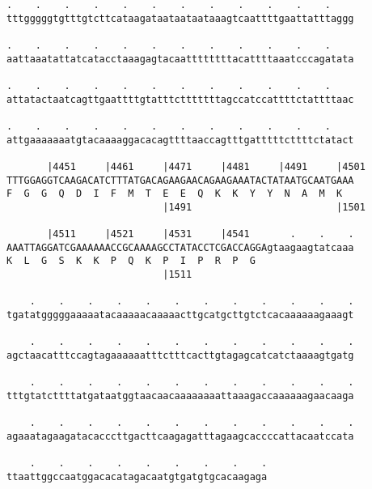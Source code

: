 \documentclass{article}
\begin{document}
\begin{Verbatim}
.    .    .    .    .    .    .    .    .    .    .    .    
tttgggggtgtttgtcttcataagataataataataaagtcaattttgaattatttaggg
                                                            
.    .    .    .    .    .    .    .    .    .    .    .    
aattaaatattatcatacctaaagagtacaattttttttacattttaaatcccagatata
                                                            
.    .    .    .    .    .    .    .    .    .    .    .    
attatactaatcagttgaattttgtatttctttttttagccatccattttctattttaac
                                                            
.    .    .    .    .    .    .    .    .    .    .    .    
attgaaaaaaatgtacaaaaggacacagttttaaccagtttgatttttcttttctatact
                                                            
       |4451     |4461     |4471     |4481     |4491     |4501
TTTGGAGGTCAAGACATCTTTATGACAGAAGAACAGAAGAAATACTATAATGCAATGAAA
F  G  G  Q  D  I  F  M  T  E  E  Q  K  K  Y  Y  N  A  M  K  
                           |1491                         |1501
  
       |4511     |4521     |4531     |4541       .    .    .
AAATTAGGATCGAAAAAACCGCAAAAGCCTATACCTCGACCAGGAgtaagaagtatcaaa
K  L  G  S  K  K  P  Q  K  P  I  P  R  P  G                 
                           |1511                            
  
    .    .    .    .    .    .    .    .    .    .    .    .
tgatatgggggaaaaatacaaaaacaaaaacttgcatgcttgtctcacaaaaaagaaagt
                                                            
    .    .    .    .    .    .    .    .    .    .    .    .
agctaacatttccagtagaaaaaatttctttcacttgtagagcatcatctaaaagtgatg
                                                            
    .    .    .    .    .    .    .    .    .    .    .    .
tttgtatcttttatgataatggtaacaacaaaaaaaattaaagaccaaaaaagaacaaga
                                                            
    .    .    .    .    .    .    .    .    .    .    .    .
agaaatagaagatacacccttgacttcaagagatttagaagcaccccattacaatccata
                                                            
    .    .    .    .    .    .    .    .    .
ttaattggccaatggacacatagacaatgtgatgtgcacaagaga
                                             
                                             
 

\end{Verbatim}
\end{document}
